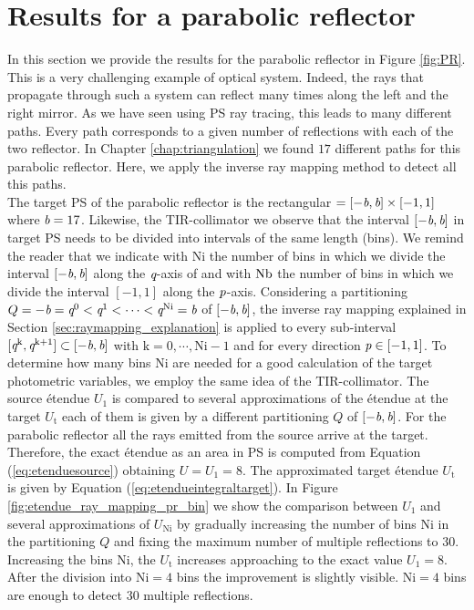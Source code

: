 \section{Results for a parabolic reflector}\label{sec:PR}
In this section we provide the results for the parabolic reflector in Figure \ref{fig:PR}.
This is a very challenging example of optical system. Indeed, the rays that propagate through such a system can reflect many times along the left and the right mirror. As we have seen using PS ray tracing, this leads to many different paths. Every path corresponds to a given number of reflections with each of the two reflector. In Chapter \ref{chap:triangulation} we found $17$ different paths for this parabolic reflector. Here, we apply the inverse ray mapping method to detect all this paths. \\ \indent
The target PS of the parabolic reflector is the rectangular $=[-\textit{b}, \textit{b}]\times[-1,1]$ where $\textit{b}=17$. Likewise, the TIR-collimator we observe that the interval $[-\textit{b}, \textit{b}]$ in target PS needs to be divided into intervals of the same length (bins). We remind the reader that we indicate with $\textrm{Ni}$ the number of bins in which we divide the interval $[-\textit{b}, \textit{b}]$ along the $\textit{q}$-axis of  and with $\textrm{Nb}$ the number of bins in which we divide the interval $[-1,1]$ along the $\textit{p}$-axis. Considering a partitioning $Q = -\textit{b}=\textit{q}^{0}<\textit{q}^{1}<\cdots<\textit{q}^{\textrm{Ni}}=\textit{b}$ of $[-\textit{b}, \textit{b}]$, the inverse ray mapping explained in Section \ref{sec:raymapping_explanation} is applied to every sub-interval $[\textit{q}^{\textrm{k}}, \textit{q}^{\textrm{k+1}}]\subset[-\textit{b}, \textit{b}]$ with $\textrm{k}=0, \cdots, \textrm{Ni}-1$ and for every direction $\textit{p}\in[-1,1]$. To determine how many bins $\textrm{Ni}$ are needed for a good calculation of the target photometric variables, we employ the same idea of the TIR-collimator. The source \'{e}tendue $U_1$ is compared to several approximations of the \'{e}tendue at the target $U_{\textrm{t}}$ each of them is given by a different partitioning $Q$ of $[-\textit{b}, \textit{b}]$. For the parabolic reflector all the rays emitted from the source arrive at the target. Therefore, the exact \'{e}tendue as an area in PS is computed from Equation (\ref{eq:etenduesource}) obtaining $U=U_1=8$. The approximated target \'{e}tendue $U_{\textrm{t}}$ is given by Equation (\ref{eq:etendueintegraltarget}). In Figure \ref{fig:etendue_ray_mapping_pr_bin} we show the comparison between $U_1$ and several approximations of $U_{\textrm{Ni}}$ by gradually increasing the number of bins $\textrm{Ni}$ in the partitioning $Q$ and fixing the maximum number of multiple reflections to $30$. Increasing the bins $\textrm{Ni}$, the $U_{\textrm{t}}$ increases approaching to the exact value $U_1=8$. After the division into $\textrm{Ni}=4$ bins the improvement is slightly visible. $\textrm{Ni}=4$ bins are enough to detect $30$ multiple reflections.
